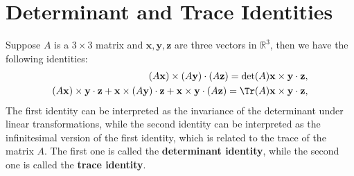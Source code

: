 \section{Determinant and Trace Identities}
Suppose \(A\) is a \(3 \times 3\) matrix and \(\mathbf{x}, \mathbf{y}, \mathbf{z}\) are three vectors in \(\mathbb{R}^3\), then we have the following identities:
\[
    \begin{aligned}
        (A \mathbf{x}) \times (A \mathbf{y}) \cdot (A \mathbf{z}) = \det(A) \mathbf{x} \times \mathbf{y} \cdot \mathbf{z}, \\
        (A \mathbf{x}) \times \mathbf{y} \cdot \mathbf{z} + \mathbf{x} \times (A \mathbf{y}) \cdot \mathbf{z} + \mathbf{x} \times \mathbf{y} \cdot (A \mathbf{z}) = \Tr(A) \mathbf{x} \times \mathbf{y} \cdot \mathbf{z},
    \end{aligned}
\]
The first identity can be interpreted as the invariance of the determinant under linear transformations, while the second identity can be interpreted as the infinitesimal version of the first identity, which is related to the trace of the matrix \(A\). The first one is called the \textbf{determinant identity}, while the second one is called the \textbf{trace identity}.
